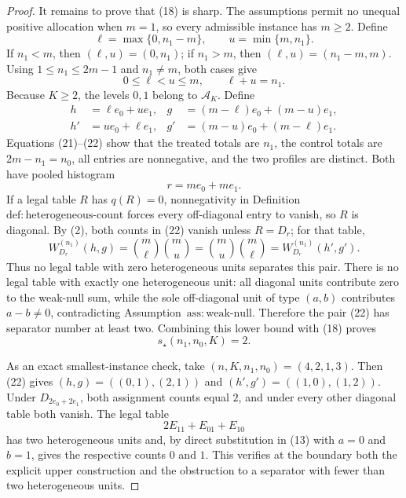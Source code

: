 \documentclass{article}
\begin{document}
\begin{proof}
It remains to prove that (18) is sharp.  The assumptions permit no unequal positive allocation when \(m=1\), so every admissible instance has \(m\geq2\).  Define
\[
 \ell=\max\{0,n_1-m\},
 \qquad
 u=\min\{m,n_1\}.
 \tag{20}
\]
If \(n_1<m\), then \((\ell,u)=(0,n_1)\); if \(n_1>m\), then \((\ell,u)=(n_1-m,m)\).  Using \(1\leq n_1\leq2m-1\) and \(n_1\neq m\), both cases give
\[
 0\leq\ell<u\leq m,
 \qquad \ell+u=n_1.
 \tag{21}
\]
Because \(K\geq2\), the levels \(0,1\) belong to \(\mathcal A_K\).  Define
\[
 \begin{aligned}
 h&=\ell e_0+u e_1,
 &g&=(m-\ell)e_0+(m-u)e_1,\\
 h'&=u e_0+\ell e_1,
 &g'&=(m-u)e_0+(m-\ell)e_1.
 \end{aligned}
 \tag{22}
\]
Equations (21)--(22) show that the treated totals are \(n_1\), the control totals are \(2m-n_1=n_0\), all entries are nonnegative, and the two profiles are distinct.  Both have pooled histogram
\[
 r=me_0+me_1.
 \tag{23}
\]
If a legal table \(R\) has \(q(R)=0\), nonnegativity in Definition~\(\mathrm{def:heterogeneous\mbox{-}count}\) forces every off-diagonal entry to vanish, so \(R\) is diagonal.  By (2), both counts in (22) vanish unless \(R=D_r\); for that table,
\[
 W_{D_r}^{(n_1)}(h,g)
 =\binom m\ell\binom mu
 =\binom mu\binom m\ell
 =W_{D_r}^{(n_1)}(h',g').
 \tag{24}
\]
Thus no legal table with zero heterogeneous units separates this pair.  There is no legal table with exactly one heterogeneous unit: all diagonal units contribute zero to the weak-null sum, while the sole off-diagonal unit of type \((a,b)\) contributes \(a-b\neq0\), contradicting Assumption~\(\mathrm{ass:weak\mbox{-}null}\).  Therefore the pair (22) has separator number at least two.  Combining this lower bound with (18) proves
\[
 s_\star(n_1,n_0,K)=2.
 \tag{25}
\]

As an exact smallest-instance check, take \((n,K,n_1,n_0)=(4,2,1,3)\).  Then (22) gives \((h,g)=((0,1),(2,1))\) and \((h',g')=((1,0),(1,2))\).  Under \(D_{2e_0+2e_1}\), both assignment counts equal \(2\), and under every other diagonal table both vanish.  The legal table
\[
 2E_{11}+E_{01}+E_{10}
\]
has two heterogeneous units and, by direct substitution in (13) with \(a=0\) and \(b=1\), gives the respective counts \(0\) and \(1\).  This verifies at the boundary both the explicit upper construction and the obstruction to a separator with fewer than two heterogeneous units.
\end{proof}
\end{document}
